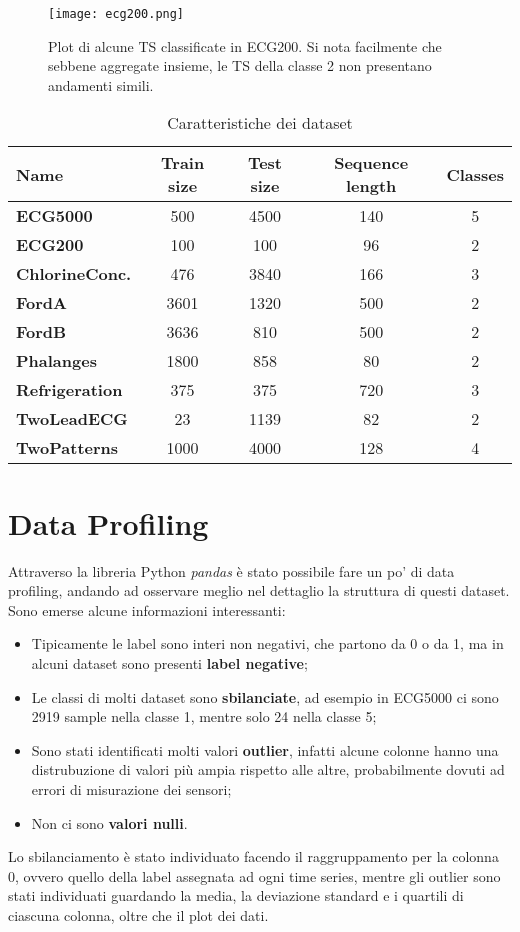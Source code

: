 \begin{figure}[H]
	\centering
	\texttt{[image: ecg200.png]}
	\caption{Plot di alcune TS classificate in ECG200. Si nota facilmente che sebbene aggregate insieme, le TS della classe 2 non presentano andamenti simili.}
	\label{fig:ecg200}
\end{figure}

\begin{table}[H]
	\centering
	\begin{tabularx}{\textwidth}{X c c c c}
		\hline
		\textbf{Name} & \textbf{Train size} & \textbf{Test size} & \textbf{Sequence length} & \textbf{Classes} \\
		\hline
		\textbf{ECG5000} & 500 & 4500 & 140 & 5\\
		\textbf{ECG200} & 100 & 100 & 96 & 2\\
		\textbf{ChlorineConc.} & 476 & 3840 & 166 & 3\\
		\textbf{FordA} & 3601 & 1320 & 500 & 2\\
		\textbf{FordB} & 3636 & 810 & 500 & 2\\
		\textbf{Phalanges} & 1800 & 858 & 80 & 2\\
		\textbf{Refrigeration} & 375 & 375 & 720 & 3\\
		\textbf{TwoLeadECG} & 23 & 1139 & 82 & 2\\
		\textbf{TwoPatterns} & 1000 & 4000 & 128 & 4\\
	\end{tabularx}
	\caption{Caratteristiche dei dataset}
	\label{tab:datasets}
\end{table}

\section{Data Profiling}
Attraverso la libreria Python \textit{pandas} è stato possibile fare un po' di data profiling, andando ad osservare meglio nel dettaglio la struttura di questi dataset.\\
Sono emerse alcune informazioni interessanti:
\begin{itemize}
	\item Tipicamente le label sono interi non negativi, che partono da 0 o da 1, ma in alcuni dataset sono presenti \textbf{label negative};
	\item Le classi di molti dataset sono \textbf{sbilanciate}, ad esempio in ECG5000 ci sono 2919 sample nella classe 1, mentre solo 24 nella classe 5;
	\item Sono stati identificati molti valori \textbf{outlier}, infatti alcune colonne hanno una distrubuzione di valori più ampia rispetto alle altre, probabilmente dovuti ad errori di misurazione dei sensori;
	\item Non ci sono \textbf{valori nulli}.
\end{itemize}
Lo sbilanciamento è stato individuato facendo il raggruppamento per la colonna 0, ovvero quello della label assegnata ad ogni time series, mentre gli outlier sono stati individuati guardando la media, la deviazione standard e i quartili di ciascuna colonna, oltre che il plot dei dati.\\


